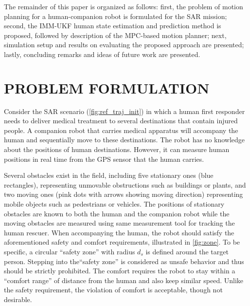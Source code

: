 \documentclass[letterpaper, 10 pt, conference]{ieeeconf}
\begin{document}
	The remainder of this paper is organized as follows:
	first, the problem of motion planning for a human-companion robot is formulated for the SAR mission;
	second, the IMM-UKF human state estimation and prediction method is proposed, followed by description of the MPC-based motion planner;
	next, simulation setup and results on evaluating the proposed approach are presented; 
	lastly, concluding remarks and ideas of future work are presented.
	
	\section{PROBLEM FORMULATION}\label{sec:formulation}
	Consider the SAR scenario (\cref{fig:ref_traj_init}) in which a human first responder needs to deliver medical treatment to several destinations that contain injured people. 
	A companion robot that carries medical apparatus will accompany the human and sequentially move to these destinations.
	The robot has no knowledge about the positions of human destinations.
	However, it can measure human positions in real time from the GPS sensor that the human carries.
	
	Several obstacles exist in the field, including five stationary ones (blue rectangles), representing unmovable obstructions such as buildings or plants, and two moving ones (pink dots with arrows showing moving direction) representing mobile objects such as pedestrians or vehicles.
	The positions of stationary obstacles are known to both the human and the companion robot while the moving obstacles are measured using same measurement tool for tracking the human rescuer.
	When accompanying the human, the robot should satisfy the aforementioned safety and comfort requirements, illustrated in \cref{fig:zone}.
	To be specific, a circular ``safety zone'' with radius $d_s$ is defined around the target person.
	Stepping into the``safety zone'' is considered as unsafe behavior and thus should be strictly prohibited.
	The comfort requires the robot to stay within a ``comfort range'' of  distance from the human and also keep similar speed.
	Unlike the safety requirement, the violation of comfort is acceptable, though not desirable.
	
\end{document}
